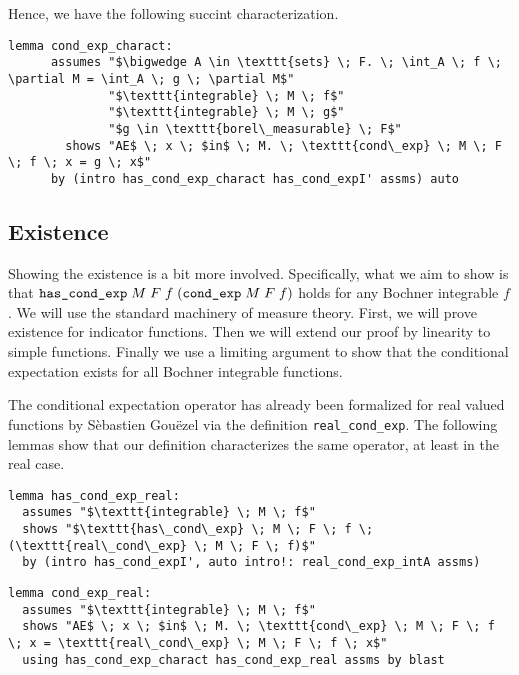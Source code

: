 Hence, we have the following succint characterization.

\begin{isalemma}
{\small
	\begin{lstlisting}[style=isabelle]
	lemma cond_exp_charact:
	  assumes "$\bigwedge A \in \texttt{sets} \; F. \; \int_A \; f \; \partial M = \int_A \; g \; \partial M$"
			  "$\texttt{integrable} \; M \; f$"
			  "$\texttt{integrable} \; M \; g$"
			  "$g \in \texttt{borel\_measurable} \; F$"
		shows "AE$ \; x \; $in$ \; M. \; \texttt{cond\_exp} \; M \; F \; f \; x = g \; x$"
	  by (intro has_cond_exp_charact has_cond_expI' assms) auto
	\end{lstlisting}
}
\end{isalemma}

\subsection{Existence}

Showing the existence is a bit more involved. Specifically, what we aim to show is that $\normalfont\texttt{has\_cond\_exp} \; M \; F \; f \; (\texttt{cond\_exp} \; M \; F \; f)$ holds for any Bochner integrable $f$. We will use the standard machinery of measure theory. First, we will prove existence for indicator functions. Then we will extend our proof by linearity to simple functions. Finally we use a limiting argument to show that the conditional expectation exists for all Bochner integrable functions.

The conditional expectation operator has already been formalized for real valued functions by S\`ebastien Gou\"ezel via the definition \texttt{real\_cond\_exp}. The following lemmas show that our definition characterizes the same operator, at least in the real case.

\begin{isalemma}
{\small
	\begin{lstlisting}[style=isabelle]
lemma has_cond_exp_real:
  assumes "$\texttt{integrable} \; M \; f$"
  shows "$\texttt{has\_cond\_exp} \; M \; F \; f \; (\texttt{real\_cond\_exp} \; M \; F \; f)$"
  by (intro has_cond_expI', auto intro!: real_cond_exp_intA assms)
	\end{lstlisting}
}
\end{isalemma}

\begin{isalemma}
{\small
	\begin{lstlisting}[style=isabelle]
lemma cond_exp_real:
  assumes "$\texttt{integrable} \; M \; f$"
  shows "AE$ \; x \; $in$ \; M. \; \texttt{cond\_exp} \; M \; F \; f \; x = \texttt{real\_cond\_exp} \; M \; F \; f \; x$" 
  using has_cond_exp_charact has_cond_exp_real assms by blast
	\end{lstlisting}
}
\end{isalemma}

